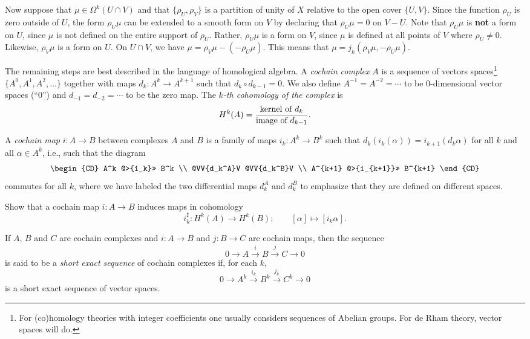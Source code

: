 \documentclass[12pt]{amsbook}
\theoremstyle{definition}
\begin{document}
Now suppose that $\mu \in \Omega^k(U \cap V)$ and that $\{\rho_U, \rho_V\}$
is a partition of unity of $X$ relative to the open cover $\{U,V\}$. Since
the function $\rho_U$ is zero outside of $U$, the form $\rho_U \mu$ 
can be extended to a smooth form on $V$ by declaring that $\rho_U\mu=0$
on $V - U$. 
Note that 
$\rho_U \mu$ is {\bf not} a form on $U$, since $\mu$ is not defined 
on the entire support of $\rho_U$. Rather, $\rho_U \mu$ is a form
on $V$, since $\mu$ is defined at all points of $V$ where $\rho_U \ne 0$.
Likewise, $\rho_V \mu$ is a form on $U$. On $U\cap V$, we have  
$ \mu = \rho_V\mu-(-\rho_U \mu)$. This means that 
$\mu  = j_k(\rho_V \mu,-\rho_U\mu)$. 

The remaining steps are best described in the language of homological algebra.
A {\em cochain complex} $A$ is a sequence of vectors spaces\footnote{For 
(co)homology theories with integer coefficients one usually considers 
sequences of Abelian groups. For de Rham theory, vector spaces will do.}
$\{A^0, A^1, A^2, \ldots\}$ together with maps $d_k: A^k \to A^{k+1}$ such
that $d_{k}\circ d_{k-1}=0$. We also define $A^{-1}=A^{-2}=\cdots$ to 
be 0-dimensional vector spaces (``0'') and 
$d_{-1}=d_{-2}=\cdots$ to be the zero map. 
The {\em $k$-th cohomology of the complex} is
$$ H^k(A) = \frac{\hbox{kernel of $d_k$}}{\hbox{image of $d_{k-1}$}}.$$

A {\em cochain map} $i: A \to B$ between complexes $A$ and $B$ is a family of maps 
$i_k: A^k \to B^k$ such that $d_k(i_k(\alpha))=i_{k+1}(d_k\alpha)$ for all $k$
and all $\alpha \in A^k$, i.e., such that the diagram
$$ \begin{CD}
A^k @>{i_k}>> B^k \\ 
@VV{d_k^A}V @VV{d_k^B}V \\
A^{k+1} @>{i_{k+1}}>> B^{k+1}
\end{CD}
$$
commutes for all $k$, where we have labeled the two differential maps $d_k^A$ and $d_k^B$ to emphasize that they 
are defined on different spaces. 

\smallskip

 Show that a cochain map $i: A \to B$ induces maps in cohomology
$$i_k^\sharp: H^k(A) \to H^k(B); \qquad [\alpha] \mapsto [i_k\alpha].$$

\smallskip

If $A$, $B$ and $C$ are cochain complexes and $i: A \to B$ and $j: B \to C$ 
are cochain maps, then the sequence 
$$ 0 \rightarrow A \xrightarrow i B \xrightarrow j C \rightarrow 0$$
is said to be a {\em short exact sequence} of cochain complexes if, for each
$k$, 
$$ 0 \rightarrow A^k \xrightarrow {i_k} B^k \xrightarrow {j_k} C^k \rightarrow 0$$  
is a short exact sequence of vector spaces.  
\end{document}

